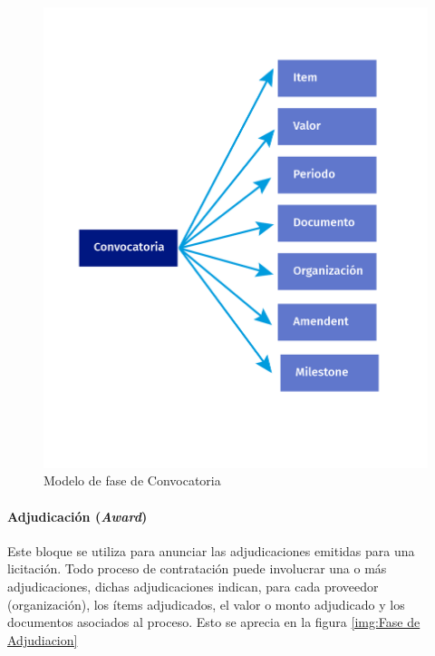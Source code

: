 \begin{figure}[htbp!]
    \centering
    \includegraphics[width=150mm]{figuras/Diagramas_Convocatoria.png}
    \caption{Modelo de fase de Convocatoria}
    \label{img:Fase de Convocatoria}
\end{figure}

\paragraph{Adjudicación (\textit{Award})}\hfill \break
Este bloque se utiliza para anunciar las adjudicaciones emitidas para una licitación. Todo proceso de contratación puede involucrar una o más adjudicaciones, dichas adjudicaciones indican, para cada proveedor (organización), los ítems adjudicados, el valor o monto adjudicado y los documentos asociados al proceso. Esto se aprecia en la figura \ref{img:Fase de Adjudiacion}



